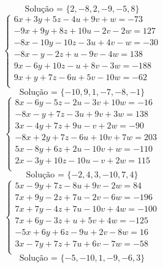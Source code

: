 \documentclass[12pt,oneside,a4paper]{article}
\begin{document}
\begin{equation*}
\text{Solução = }\{2,-8,2,-9,-5,8\}
\end{equation*}
\vspace{\baselineskip}
\begin{equation*}
\begin{cases}
6x+3y+5z-4u+9v+w=-73 \\
-9x+9y+8z+10u-2v-2w=127 \\
-8x-10y-10z-3u+4v-w=-30 \\
-8x-y-2z+u-9v-4w=138 \\
9x-6y+10z-u+8v-3w=-188 \\
9x+y+7z-6u+5v-10w=-62 \\
\end{cases}
\end{equation*}
\begin{equation*}
\text{Solução = }\{-10,9,1,-7,-8,-1\}
\end{equation*}
\vspace{\baselineskip}
\begin{equation*}
\begin{cases}
8x-6y-5z-2u-3v+10w=-16 \\
-8x-y+7z-3u+9v+3w=138 \\
3x-4y+7z+9u-v+2w=-90 \\
-8x+2y+7z-6u+10v+7w=203 \\
5x-8y+6z+2u-10v+w=-110 \\
2x-3y+10z-10u-v+2w=115 \\
\end{cases}
\end{equation*}
\begin{equation*}
\text{Solução = }\{-2,4,3,-10,7,4\}
\end{equation*}
\vspace{\baselineskip}
\begin{equation*}
\begin{cases}
5x-9y+7z-8u+9v-2w=84 \\
7x+9y-2z+7u-2v-6w=-196 \\
7x+7y-4z+7u-10v+4w=-100 \\
7x+6y-3z+u+5v+4w=-125 \\
-5x+6y+6z-9u+2v-8w=16 \\
3x-7y+7z+7u+6v-7w=-58 \\
\end{cases}
\end{equation*}
\begin{equation*}
\text{Solução = }\{-5,-10,1,-9,-6,3\}
\end{equation*}
\end{document}

